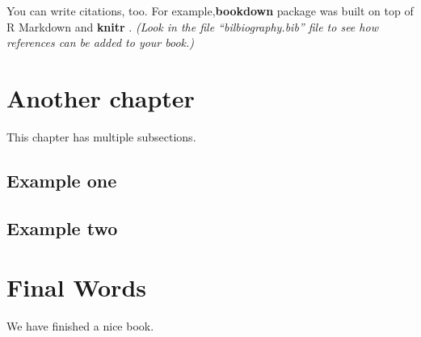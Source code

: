 \documentclass[
]{book}
\begin{document}
You can write citations, too. For example,\textbf{bookdown} package was built on top of R Markdown and \textbf{knitr} \citep{xie2015}. \emph{(Look in the file ``bilbiography.bib'' file to see how references can be added to your book.)}

\hypertarget{another-chapter}{%
\chapter{Another chapter}\label{another-chapter}}

This chapter has multiple subsections.

\hypertarget{example-one}{%
\section{Example one}\label{example-one}}

\hypertarget{example-two}{%
\section{Example two}\label{example-two}}

\hypertarget{final-words}{%
\chapter{Final Words}\label{final-words}}

We have finished a nice book.

  
\end{document}

